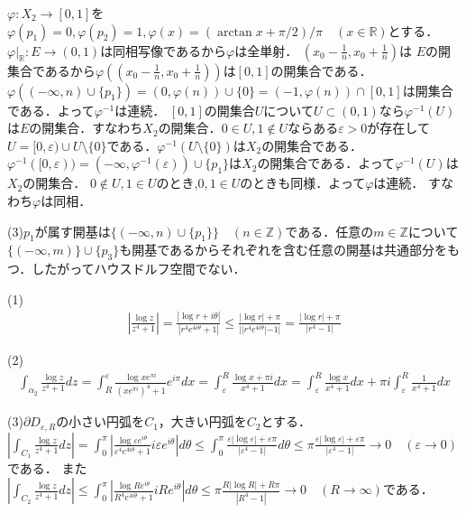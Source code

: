 \documentclass[
		book,
		head_space=20mm,
		foot_space=20mm,
		gutter=10mm,
		line_length=190mm
]{jlreq}
\begin{document}
$\varphi\colon X_2 \rightarrow [0,1]$を
$\varphi(p_1)=0,\varphi(p_2)=1,\varphi(x)=(\arctan x+\pi/2)/\pi \quad (x\in \mathbb{R})$とする．$\varphi|_{\mathbb{R}}\colon E\rightarrow(0,1)$は同相写像であるから$\varphi$は全単射．
$(x_0-\frac{1}{n},x_0+\frac{1}{n})$は $E$の開集合であるから$\varphi((x_0-\frac{1}{n},x_0+\frac{1}{n}))$は$[0,1]$の開集合である．$\varphi((-\infty,n)\cup\{p_1\})=(0,\varphi(n))\cup \{0\}=(-1,\varphi(n))\cap [0,1]$は開集合である．よって$\varphi^{-1}$は連続．
$[0,1]$の開集合$U$について$U \subset (0,1)$なら$\varphi^{-1}(U)$は$E$の開集合．すなわち$X_2$の開集合．$0 \in U,1\notin U$ならある$\varepsilon>0$が存在して$U=[0,\varepsilon)\cup U\setminus\{0\}$である．$\varphi^{-1}(U\setminus \{0\})$は$X_2$の開集合である．$\varphi^{-1}([0,\varepsilon))=(-\infty,\varphi^{-1}(\varepsilon))\cup\{p_1\}$は$X_2$の開集合である．よって$\varphi^{-1}(U)$は$X_2$の開集合．
$0\notin U,1\in U$のとき,$0,1\in U$のときも同様．よって$\varphi$は連続．
すなわち$\varphi$は同相．

(3)$p_1$が属す開基は$\{(-\infty,n)\cup\{p_1\}\}\quad(n\in \mathbb{Z})$である．任意の$m\in \mathbb{Z}$について$ \{ (-\infty,m)\} \cup \{p_3\}$も開基であるからそれぞれを含む任意の開基は共通部分をもつ．したがってハウスドルフ空間でない．

(1)\begin{align}
    \left| \frac{\log z}{z^4+1} \right|= \frac{|\log r + i\theta|}{|r^4e^{4i\theta}+1|}\le \frac{|\log r|+\pi}{||r^4e^{4i\theta}|-1|}= \frac{|\log r|+\pi}{|r^4-1|}
\end{align}

(2)\begin{align}
    \int_{\alpha_2}\frac{\log z}{z^4+1}dz=\int_{R}^{\varepsilon} \frac{\log xe^{\pi i}}{(x e^{\pi i})^4+1}e^{i\pi}dx=\int_{\varepsilon}^R \frac{\log x+\pi i}{x^4+1}dx = \int_{\varepsilon}^R \frac{\log x}{x^4+1}dx + \pi i\int_{\varepsilon}^R \frac{1}{x^4+1}dx
\end{align}

(3)$\partial D_{\varepsilon,R}$の小さい円弧を$C_1$，大きい円弧を$C_2$とする．
$\left|\int_{C_1}\frac{\log z}{z^4+1}dz\right|=\int_{0}^\pi \left|\frac{\log \varepsilon e^{i\theta}}{\varepsilon^4e^{4i\theta}+1}i \varepsilon e^{i\theta}\right|d\theta\le \int_{0}^\pi \frac{\varepsilon\left|\log \varepsilon\right|+\varepsilon\pi}{\left|\varepsilon^4-1\right|}d\theta\le \pi \frac{\varepsilon\left|\log \varepsilon\right|+\varepsilon\pi}{\left|\varepsilon^4-1\right|}\rightarrow 0\quad (\varepsilon\rightarrow 0)$である．
また$\left|\int_{C_2}\frac{\log z}{z^4+1}dz\right|\le \int_{0}^\pi \left|\frac{\log Re^{i\theta}}{R^4e^{4i\theta}+1}i Re^{i\theta}\right|d\theta \le \pi \frac{R\left|\log R\right|+R\pi}{\left|R^4-1\right|}\rightarrow 0\quad (R\rightarrow \infty)$である．
\end{document}
